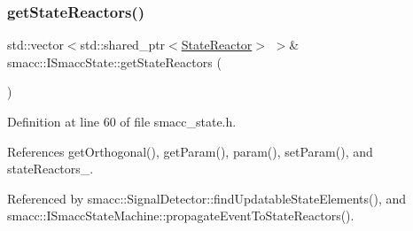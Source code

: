 \subsubsection{\texorpdfstring{get\+State\+Reactors()}{getStateReactors()}}
{\footnotesize\ttfamily std\+::vector$<$std\+::shared\+\_\+ptr$<$\hyperlink{classsmacc_1_1StateReactor}{State\+Reactor}$>$ $>$\& smacc\+::\+I\+Smacc\+State\+::get\+State\+Reactors (\begin{DoxyParamCaption}{ }\end{DoxyParamCaption})\hspace{0.3cm}{\ttfamily [inline]}}



Definition at line 60 of file smacc\+\_\+state.\+h.



References get\+Orthogonal(), get\+Param(), param(), set\+Param(), and state\+Reactors\+\_\+.



Referenced by smacc\+::\+Signal\+Detector\+::find\+Updatable\+State\+Elements(), and smacc\+::\+I\+Smacc\+State\+Machine\+::propagate\+Event\+To\+State\+Reactors().


